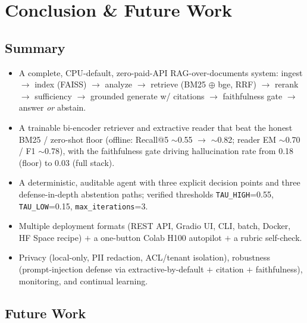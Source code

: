\documentclass[12pt,a4paper]{article}
\begin{document}
\section{Conclusion \& Future Work}

\subsection{Summary}

\begin{itemize}\setlength\itemsep{0.15em}
  \item A complete, CPU-default, zero-paid-API RAG-over-documents system: ingest $\rightarrow$ index (FAISS) $\rightarrow$ analyze $\rightarrow$ retrieve (BM25 $\oplus$ bge, RRF) $\rightarrow$ rerank $\rightarrow$ sufficiency $\rightarrow$ grounded generate w/ citations $\rightarrow$ faithfulness gate $\rightarrow$ answer \emph{or} abstain.
  \item A trainable bi-encoder retriever and extractive reader that beat the honest BM25 / zero-shot floor (offline: Recall@5 $\sim$0.55 $\rightarrow$ $\sim$0.82; reader EM $\sim$0.70 / F1 $\sim$0.78), with the faithfulness gate driving hallucination rate from 0.18 (floor) to 0.03 (full stack).
  \item A deterministic, auditable agent with three explicit decision points and three defense-in-depth abstention paths; verified thresholds \texttt{TAU\_HIGH}=0.55, \texttt{TAU\_LOW}=0.15, \texttt{max\_iterations}=3.
  \item Multiple deployment formats (REST API, Gradio UI, CLI, batch, Docker, HF Space recipe) $+$ a one-button Colab H100 autopilot $+$ a rubric self-check.
  \item Privacy (local-only, PII redaction, ACL/tenant isolation), robustness (prompt-injection defense via extractive-by-default $+$ citation $+$ faithfulness), monitoring, and continual learning.
\end{itemize}

\subsection{Future Work}
\end{document}
